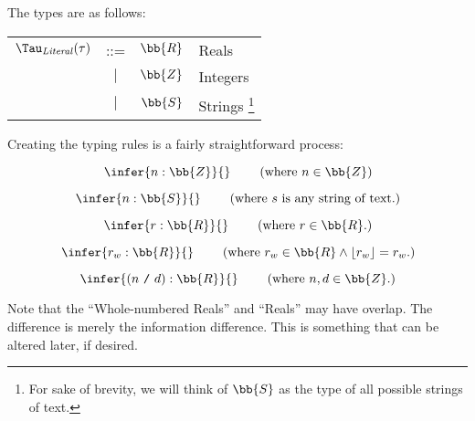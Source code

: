 The types are as follows:

\begin{longtable}{ r c c l}
      \(\Tau_{\mathit{Literal}}(\tau)\) & ::=       & \(\bb{R}\) & Reals    \\
                                        & \(\vert\) & \(\bb{Z}\) & Integers \\
                                        & \(\vert\) & \(\bb{S}\) & Strings
      \footnote{For sake of brevity, we will think of \(\bb{S}\) as the type of
            all possible strings of text.}
\end{longtable}

Creating the typing rules is a fairly straightforward process:

\begin{equation}
      \left.
      \infer{n : \bb{Z}}{}
      \right.
      \qquad
      \text{(where \(n \in \bb{Z}\))}
      \label{tr:lit:int}
\end{equation}

\begin{equation}
      \left.
      \infer{n : \bb{S}}{}
      \right.
      \qquad
      \text{(where \(s\) is any string of text.)}
      \label{tr:lit:string}
\end{equation}

\begin{equation}
      \left.
      \infer{r : \bb{R}}{}
      \right.
      \qquad
      \text{(where \(r \in \bb{R}\).)}
      \label{tr:lit:real}
\end{equation}

\begin{equation}
      \left.
      \infer{r_w : \bb{R}}{}
      \right.
      \qquad
      \text{(where \(r_w \in \bb{R} \land \lfloor{} r_w \rfloor{} = r_w\).)}
      \label{tr:lit:wholeReal}
\end{equation}

\begin{equation}
      \left.
      \infer{(n\ \texttt{/}\ d) : \bb{R}}{}
      \right.
      \qquad
      \text{(where \(n, d \in \bb{Z}\).)}
      \label{tr:lit:fraction}
\end{equation}

Note that the ``Whole-numbered Reals'' and ``Reals'' may have overlap. The
difference is merely the information difference. This is something that can be
altered later, if desired.






